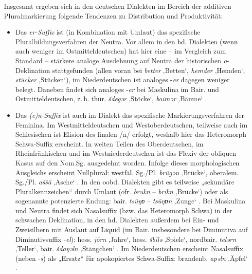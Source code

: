 Insgesamt ergeben sich in den deutschen Dialekten im Bereich der additiven Pluralmarkierung folgende Tendenzen zu Distribution und Produktivität:\largerpage

\begin{itemize}
\item Das \textit{\textit{er}}\textit{{}-Suffix} ist (in Kombination mit Umlaut) das spezifische Pluralbildungsverfahren der Neutra. Vor allem in den hd. Dialekten (wenn auch weniger im Ostmitteldeutschen) hat hier eine -- im Vergleich zum Standard -- stärkere analoge Ausdehnung auf Neutra der historischen \textit{a}{}-Deklination stattgefunden (allen voran bei \textit{better} ‚Betten‘, \textit{hemder} ‚Hemden‘, \textit{stücker} ‚Stücken‘), im Niederdeutschen ist analoges -\textit{er} dagegen weniger belegt. Daneben findet sich analoges -\textit{er} bei Maskulina im Bair. und Ostmitteldeutschen, z.\,b. thür. \textit{šdegər} ‚Stöcke‘, \textit{baimər} ‚Bäume‘ \citep[420]{Schirmunski1962}.
\item Das \textit{\textit{(e)n}}\textit{{}-Suffix} ist auch im Dialekt das spezifische Markierungsverfahren der Feminina. Im Westmitteldeutschen und Westoberdeutschen, teilweise auch im Schlesischen ist Elision des finalen /n/ erfolgt, weshalb hier das Heteromorph Schwa-Suffix erscheint. In weiten Teilen des Oberdeutschen, im Rheinfränkischen und im Westniederdeutschen ist das Flexiv der obliquen Kasus auf den Nom.Sg. ausgedehnt worden. Infolge dieses morphologischen Ausgleichs erscheint Nullplural: westfäl. Sg./Pl. \textit{brügən} ‚Brücke‘, ober\-alem. Sg./Pl. \textit{aššä} ‚Asche‘ \citep[431]{Schirmunski1962}. In den oobd. Dialekten gibt es teilweise „sekundäre Pluralkennzeichen“ \citep[418]{Schirmunski1962} durch Umlaut (ofr. \textit{brukn} -- \textit{brikn} ‚Brücke‘) oder als sogenannte potenzierte Endung: bair. \textit{tsūŋɒ} -- \textit{tsūŋɒn} ‚Zunge‘ \citep[431]{Schirmunski1962}. Bei Maskulina und Neutra findet sich Nasalsuffix (bzw. das Heteromorph Schwa) in der schwachen Deklination, in den hd. Dialekten außerdem bei Ein- und Zweisilbern mit Auslaut auf Liquid (im Bair. insbesondere bei Diminutiva auf Diminutivsuffix -\textit{el}): hess. \textit{jōrn} ‚Jahre‘, hess. \textit{šbīlə} ‚Spiele‘, nordbair. \textit{telərn} ‚Teller‘, bair. \textit{šdaŋəln} ‚Stängchen‘ \citep[1199]{Dingeldein1983}. Im Niederdeutschen erscheint Nasalsuffix (neben -\textit{s}) als „Ersatz“ für apokopiertes Schwa-Suffix: brandenb. \textit{apəln} ‚Äpfel‘ \citep[1200]{Dingeldein1983}.

\end{itemize}
